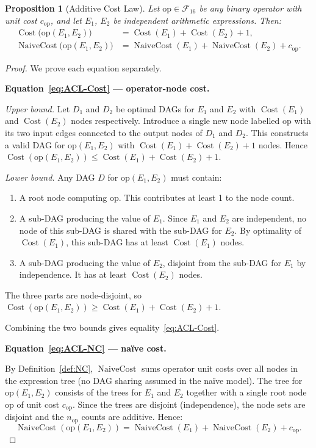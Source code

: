 \documentclass[12pt,a4paper]{article}
\newtheorem{proposition}[theorem]{Proposition}
\theoremstyle{definition}
\newcommand{\Cost}{\operatorname{Cost}}
\newcommand{\NC}{\operatorname{NaiveCost}}
\begin{document}
\begin{proposition}[Additive Cost Law]
\label{prop:ACL}
Let $\mathrm{op} \in \mathcal{F}_{16}$ be any binary operator with unit cost
$c_{\mathrm{op}}$, and let $E_1$, $E_2$ be independent arithmetic expressions.
Then:
\begin{align}
  \Cost\!\bigl(\mathrm{op}(E_1, E_2)\bigr)
    &= \Cost(E_1) + \Cost(E_2) + 1,
  \label{eq:ACL-Cost} \\[4pt]
  \NC\!\bigl(\mathrm{op}(E_1, E_2)\bigr)
    &= \NC(E_1) + \NC(E_2) + c_{\mathrm{op}}.
  \label{eq:ACL-NC}
\end{align}
\end{proposition}

\begin{proof}
We prove each equation separately.

\medskip
\textbf{Equation~\eqref{eq:ACL-Cost} --- operator-node cost.}

\emph{Upper bound.}
Let $D_1$ and $D_2$ be optimal DAGs for $E_1$ and $E_2$ with $\Cost(E_1)$ and
$\Cost(E_2)$ nodes respectively.  Introduce a single new node labelled
$\mathrm{op}$ with its two input edges connected to the output nodes of $D_1$
and $D_2$.  This constructs a valid DAG for $\mathrm{op}(E_1, E_2)$ with
$\Cost(E_1) + \Cost(E_2) + 1$ nodes.  Hence
$\Cost(\mathrm{op}(E_1, E_2)) \leq \Cost(E_1) + \Cost(E_2) + 1$.

\emph{Lower bound.}
Any DAG $D$ for $\mathrm{op}(E_1, E_2)$ must contain:
\begin{enumerate}
  \item A root node computing $\mathrm{op}$.  This contributes at least 1 to
        the node count.
  \item A sub-DAG producing the value of $E_1$.  Since $E_1$ and $E_2$ are
        independent, no node of this sub-DAG is shared with the sub-DAG for
        $E_2$.  By optimality of $\Cost(E_1)$, this sub-DAG has at least
        $\Cost(E_1)$ nodes.
  \item A sub-DAG producing the value of $E_2$, disjoint from the sub-DAG for
        $E_1$ by independence.  It has at least $\Cost(E_2)$ nodes.
\end{enumerate}
The three parts are node-disjoint, so
$\Cost(\mathrm{op}(E_1, E_2)) \geq \Cost(E_1) + \Cost(E_2) + 1$.

Combining the two bounds gives equality~\eqref{eq:ACL-Cost}.

\medskip
\textbf{Equation~\eqref{eq:ACL-NC} --- na\"{i}ve cost.}

By Definition~\ref{def:NC}, $\NC$ sums operator unit costs over all nodes in
the expression tree (no DAG sharing assumed in the na\"{i}ve model).  The tree
for $\mathrm{op}(E_1, E_2)$ consists of the trees for $E_1$ and $E_2$ together
with a single root node $\mathrm{op}$ of unit cost $c_{\mathrm{op}}$.
Since the trees are disjoint (independence), the node sets are disjoint and
the $n_{\mathrm{op}}$ counts are additive.  Hence:
\[
  \NC(\mathrm{op}(E_1, E_2)) = \NC(E_1) + \NC(E_2) + c_{\mathrm{op}}.
\]
\end{proof}
\end{document}
